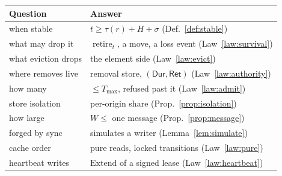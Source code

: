 \documentclass[journal]{IEEEtran}
\newcommand{\Durable}{\mathsf{Dur}}
\newcommand{\Retained}{\mathsf{Ret}}
\newcommand{\ret}{\operatorname{retire}}
\newcommand{\Tmax}{T_{\max}}
\begin{document}
\begin{center}
\small
\begin{tabular}{@{}ll@{}}
\toprule
Question & Answer\\
\midrule
when stable & $t\ge\tau(r)+H+\sigma$ (Def.~\ref{def:stable})\\
what may drop it & $\ret_t$, a move, a loss event (Law~\ref{law:survival})\\
what eviction drops & the element side (Law~\ref{law:evict})\\
where removes live & removal store, $(\Durable,\Retained)$ (Law~\ref{law:authority})\\
how many & $\le\Tmax$, refused past it (Law~\ref{law:admit})\\
store isolation & per-origin share (Prop.~\ref{prop:isolation})\\
how large & $W\le$ one message (Prop.~\ref{prop:message})\\
forged by sync & simulates a writer (Lemma~\ref{lem:simulate})\\
cache order & pure reads, locked transitions (Law~\ref{law:pure})\\
heartbeat writes & $\mathrm{Extend}$ of a signed lease (Law~\ref{law:heartbeat})\\
\bottomrule
\end{tabular}
\end{center}

\sloppy


\end{document}
